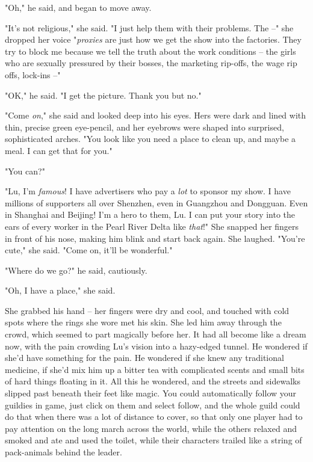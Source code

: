 "Oh," he said, and began to move away.

"It's not religious," she said. "I just help them with their
problems. The --" she dropped her voice "\emph{proxies} are just
how we get the show into the factories. They try to block me
because we tell the truth about the work conditions -- the girls
who are sexually pressured by their bosses, the marketing rip-offs,
the wage rip offs, lock-ins --"

"OK," he said. "I get the picture. Thank you but no."

"Come \emph{on}," she said and looked deep into his eyes. Hers were
dark and lined with thin, precise green eye-pencil, and her
eyebrows were shaped into surprised, sophisticated arches. "You
look like you need a place to clean up, and maybe a meal. I can get
that for you."

"You can?"

"Lu, I'm \emph{famous}! I have advertisers who pay a \emph{lot} to
sponsor my show. I have millions of supporters all over Shenzhen,
even in Guangzhou and Dongguan. Even in Shanghai and Beijing! I'm a
hero to them, Lu. I can put your story into the ears of every
worker in the Pearl River Delta like \emph{that}!" She snapped her
fingers in front of his nose, making him blink and start back
again. She laughed. "You're cute," she said. "Come on, it'll be
wonderful."

"Where do we go?" he said, cautiously.

"Oh, I have a place," she said.

She grabbed his hand -- her fingers were dry and cool, and touched
with cold spots where the rings she wore met his skin. She led him
away through the crowd, which seemed to part magically before her.
It had all become like a dream now, with the pain crowding Lu's
vision into a hazy-edged tunnel. He wondered if she'd have
something for the pain. He wondered if she knew any traditional
medicine, if she'd mix him up a bitter tea with complicated scents
and small bits of hard things floating in it. All this he wondered,
and the streets and sidewalks slipped past beneath their feet like
magic. You could automatically follow your guildies in game, just
click on them and select follow, and the whole guild could do that
when there was a lot of distance to cover, so that only one player
had to pay attention on the long march across the world, while the
others relaxed and smoked and ate and used the toilet, while their
characters trailed like a string of pack-animals behind the
leader.

